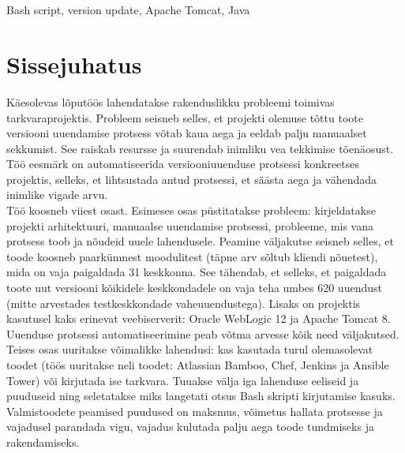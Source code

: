 \documentclass[12pt]{report}
\renewcommand{\headrulewidth}{0pt}
\begin{document}
  \\
  \vspace{2cm}

  \\
  Bash script, version update, Apache Tomcat, Java
  
  \newpage
 
  \tableofcontents
  \fancypagestyle{plain}{%
    \renewcommand{\headrulewidth}{0pt}%
    \fancyhf{}%
    \fancyfoot[R]{\thepage}%
  }
 
  \newpage
  
  \section*{Sissejuhatus}
  \label{sissejuhatus}
  
  Käesolevas lõputöös lahendatakse rakenduslikku probleemi toimivas tarkvaraprojektis. Probleem seisneb selles, et projekti olemuse tõttu toote versiooni uuendamise protsess võtab kaua aega ja eeldab palju manuaalset sekkumist. See raiskab resursse ja suurendab inimliku vea tekkimise tõenäosust. Töö eesmärk on automatiseerida versiooniuuenduse protsessi konkreetses projektis, selleks, et lihtsustada antud protsessi, et säästa aega ja vähendada inimlike vigade arvu.\\
  
  Töö koosneb viiest osast. Esimeses osas püstitatakse probleem: kirjeldatakse projekti arhitektuuri, manuaalse uuendamise protsessi, probleeme, mis vana protsess toob ja nõudeid uuele lahendusele. Peamine väljakutse seisneb selles, et toode koosneb paarkümnest moodulitest (täpne arv sõltub kliendi nõuetest), mida on vaja paigaldada 31 keskkonna. See tähendab, et selleks, et paigaldada toote uut versiooni kõikidele keskkondadele on vaja teha umbes 620 uuendust (mitte arvestades testkeskkondade vaheuuendustega). Lisaks on projektis kasutusel kaks erinevat veebiserverit: Oracle WebLogic 12 ja Apache Tomcat 8. Uuenduse protsessi automatiseerimine peab võtma arvesse kõik need väljakutsed.\\
  
  Teises osas uuritakse võimalikke lahendusi: kas kasutada turul olemasolevat toodet (töös uuritakse neli toodet: Atlassian Bamboo, Chef, Jenkins ja Ansible Tower) või kirjutada ise tarkvara. Tuuakse välja iga lahenduse eeliseid ja puuduseid ning seletatakse miks langetati otsus Bash skripti kirjutamise kasuks. Valmistoodete peamised puudused on maksmus, võimetus hallata protsesse ja vajadusel parandada vigu, vajadus kulutada palju aega toode tundmiseks ja rakendamiseks.\\
  
\end{document}
